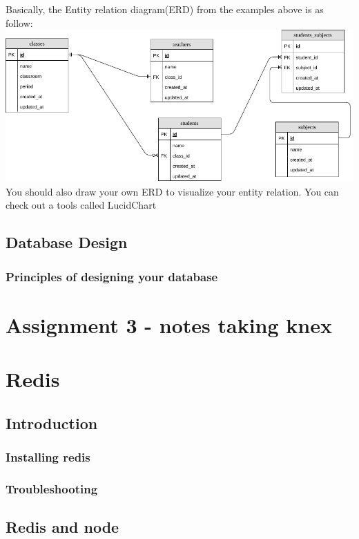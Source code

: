 \documentclass[a4paper]{article}
\begin{document}
Basically, the Entity relation diagram(ERD) from the examples above is as follow:\\
\includegraphics{img/school_entities.png}\\
You should also draw your own ERD to visualize your entity relation. You can check out a tools called LucidChart
\subsection{Database Design}
\subsubsection{Principles of designing your database}




\section{Assignment 3 - notes taking knex}

\section{Redis}
\subsection{Introduction}
\subsubsection{Installing redis}
\subsubsection{Troubleshooting}

\subsection{Redis and node}
\end{document}
